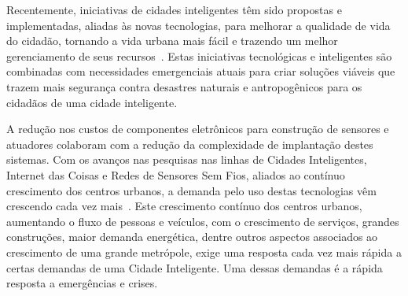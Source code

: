 \begin{refsection}
Recentemente, iniciativas de cidades inteligentes têm sido propostas e implementadas, aliadas às novas tecnologias, para melhorar a qualidade de vida do cidadão, tornando a vida urbana mais fácil e trazendo um melhor gerenciamento de seus recursos~\cite{Alkhatib2019771}. Estas iniciativas tecnológicas e inteligentes são combinadas com necessidades emergenciais atuais para criar soluções viáveis que trazem mais segurança contra desastres naturais e antropogênicos para os cidadãos de uma cidade inteligente.


A redução nos custos de componentes eletrônicos para construção de sensores e atuadores colaboram com a redução da complexidade de implantação destes sistemas. Com os avanços nas pesquisas nas linhas de Cidades Inteligentes, Internet das Coisas e Redes de Sensores Sem Fios, aliados ao contínuo crescimento dos centros urbanos, a demanda pelo uso destas tecnologias vêm crescendo cada vez mais~\cite{8472005}. Este crescimento contínuo dos centros urbanos, aumentando o fluxo de pessoas e veículos, com o crescimento de serviços, grandes construções, maior demanda energética, dentre outros aspectos associados ao crescimento de uma grande metrópole, exige uma resposta cada vez mais rápida a certas demandas de uma Cidade Inteligente. Uma dessas demandas é a rápida resposta a emergências e crises.


\end{refsection}
